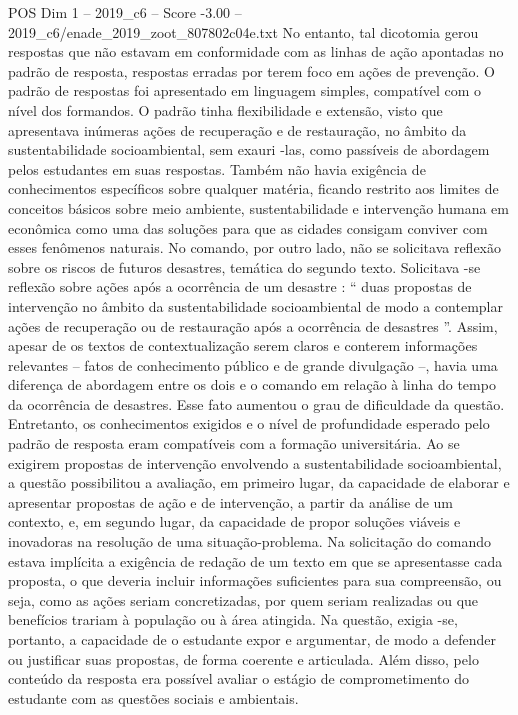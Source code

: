 \begin{textsample}{POS Dim 1 – 2019\_c6 – Score -3.00 – 2019\_c6/enade\_2019\_zoot\_807802c04e.txt}
No entanto, tal dicotomia gerou respostas que não estavam em conformidade com as linhas de ação apontadas no padrão de resposta, respostas erradas por terem foco em ações de prevenção.
O padrão de respostas foi apresentado em linguagem simples, compatível com o nível dos formandos.
O padrão tinha flexibilidade e extensão, visto que apresentava inúmeras ações de recuperação e de restauração, no âmbito da sustentabilidade socioambiental, sem exauri -las, como passíveis de abordagem pelos estudantes em suas respostas.
Também não havia exigência de conhecimentos específicos sobre qualquer matéria, ficando restrito aos limites de conceitos básicos sobre meio ambiente, sustentabilidade e intervenção humana em econômica como uma das soluções para que as cidades consigam conviver com esses fenômenos naturais.
No comando, por outro lado, não se solicitava reflexão sobre os riscos de futuros desastres, temática do segundo texto.
Solicitava -se reflexão sobre ações após a ocorrência de um desastre : “ duas propostas de intervenção no âmbito da sustentabilidade socioambiental de modo a contemplar ações de recuperação ou de restauração após a ocorrência de desastres ”.
Assim, apesar de os textos de contextualização serem claros e conterem informações relevantes – fatos de conhecimento público e de grande divulgação –, havia uma diferença de abordagem entre os dois e o comando em relação à linha do tempo da ocorrência de desastres.
Esse fato aumentou o grau de dificuldade da questão.
Entretanto, os conhecimentos exigidos e o nível de profundidade esperado pelo padrão de resposta eram compatíveis com a formação universitária.
Ao se exigirem propostas de intervenção envolvendo a sustentabilidade socioambiental, a questão possibilitou a avaliação, em primeiro lugar, da capacidade de elaborar e apresentar propostas de ação e de intervenção, a partir da análise de um contexto, e, em segundo lugar, da capacidade de propor soluções viáveis e inovadoras na resolução de uma situação-problema.
Na solicitação do comando estava implícita a exigência de redação de um texto em que se apresentasse cada proposta, o que deveria incluir informações suficientes para sua compreensão, ou seja, como as ações seriam concretizadas, por quem seriam realizadas ou que benefícios trariam à população ou à área atingida.
Na questão, exigia -se, portanto, a capacidade de o estudante expor e argumentar, de modo a defender ou justificar suas propostas, de forma coerente e articulada.
Além disso, pelo conteúdo da resposta era possível avaliar o estágio de comprometimento do estudante com as questões sociais e ambientais.

\end{textsample}
